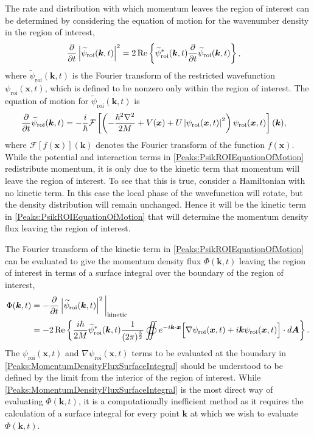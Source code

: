 The rate and distribution with which momentum leaves the region of interest can be determined by considering the equation of motion for the wavenumber density in the region of interest,
\begin{align}
    \frac{\partial }{\partial t}\left|\widetilde{\psi}_\text{roi}(\bm{k}, t)\right|^2 &= 2 \operatorname{Re} \left\{ \widetilde{\psi}_\text{roi}^*(\bm{k}, t) \frac{\partial }{\partial t}\widetilde{\psi}_\text{roi}(\bm{k}, t) \right \},
\end{align}
where $\widetilde{\psi}_\text{roi}(\bm{k}, t)$ is the Fourier transform of the restricted wavefunction $\psi_\text{roi}(\bm{x}, t)$, which is defined to be nonzero only within the region of interest. The equation of motion for $\widetilde{\psi}_\text{roi}(\bm{k}, t)$ is
\begin{align}
    \label{Peaks:PsikROIEquationOfMotion}
    \frac{\partial}{\partial t} \widetilde{\psi}_\text{roi}(\bm{k}, t) &= -\frac{i}{\hbar} \mathcal{F}\left[\left(-\frac{\hbar^2 \nabla^2}{2M} + V(\bm{x}) + U \abs{\psi_\text{roi}(\bm{x}, t)}^2\right) \psi_\text{roi}(\bm{x}, t)\right](\bm{k}),
\end{align}
where $\mathcal{F}[f(\bm{x})](\bm{k})$ denotes the Fourier transform of the function $f(\bm{x})$. While the potential and interaction terms in \eqref{Peaks:PsikROIEquationOfMotion} redistribute momentum, it is only due to the kinetic term that momentum will leave the region of interest. To see that this is true, consider a Hamiltonian with no kinetic term. In this case the local phase of the wavefunction will rotate, but the density distribution will remain unchanged. Hence it will be the kinetic term in \eqref{Peaks:PsikROIEquationOfMotion} that will determine the momentum density flux leaving the region of interest.

The Fourier transform of the kinetic term in \eqref{Peaks:PsikROIEquationOfMotion} can be evaluated to give the momentum density flux $\Phi(\bm{k}, t)$ leaving the region of interest in terms of a surface integral over the boundary of the region of interest,
\begin{align}
    \Phi(\bm{k}, t) & = -\frac{\partial }{\partial t}\abs{\widetilde{\psi}_\text{roi}(\bm{k}, t)}^2\bigg|_\text{kinetic}\\
    & = -2 \Re \left\{ \frac{i \hbar}{2 M} \widetilde{\psi}_\text{roi}^*(\bm{k}, t) \frac{1}{(2 \pi)^{\frac{3}{2}}}\oiint e^{-i \bm{k}\cdot \bm{x}} \Big[ \nabla \psi_\text{roi}(\bm{x}, t) + i \bm{k} \psi_\text{roi}(\bm{x}, t)\Big] \cdot d \bm{A} \right\}.
    \label{Peaks:MomentumDensityFluxSurfaceIntegral}
\end{align}
The $\psi_\text{roi}(\bm{x}, t)$ and $\nabla\psi_\text{roi}(\bm{x}, t)$ terms to be evaluated at the boundary in \eqref{Peaks:MomentumDensityFluxSurfaceIntegral} should be understood to be defined by the limit from the interior of the region of interest. While \eqref{Peaks:MomentumDensityFluxSurfaceIntegral} is the most direct way of evaluating $\Phi(\bm{k}, t)$, it is a computationally inefficient method as it requires the calculation of a surface integral for every point $\bm{k}$ at which we wish to evaluate $\Phi(\bm{k}, t)$. 

